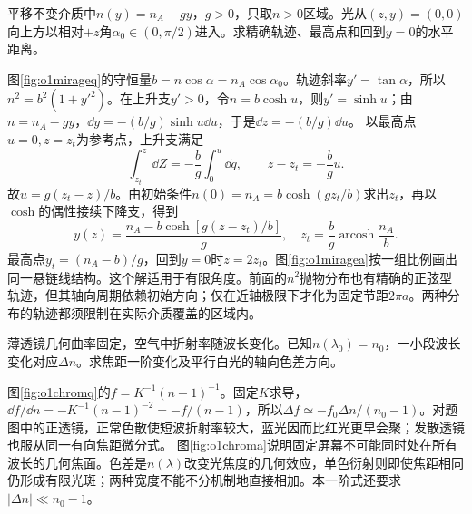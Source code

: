 \begin{exercise}\label{ex:o1mirage}
平移不变介质中$n(y)=n_A-gy$，$g>0$，只取$n>0$区域。光从$(z,y)=(0,0)$向上方以相对$+z$角$\alpha_0\in(0,\pi/2)$进入。求精确轨迹、最高点和回到$y=0$的水平距离。
\end{exercise}
\begin{solution}
图\ref{fig:o1mirageq}的守恒量$b=n\cos\alpha=n_A\cos\alpha_0$。轨迹斜率$y'=\tan\alpha$，所以$n^2=b^2(1+y'^2)$。在上升支$y'>0$，令$n=b\cosh u$，则$y'=\sinh u$；由$n=n_A-gy$，$\dd y=-(b/g)\sinh u\dd u$，于是$\dd z=-(b/g)\dd u$。
以最高点$u=0,z=z_t$为参考点，上升支满足
\[
 \int_{z_t}^{z}\dd Z=-\frac bg\int_0^u\dd q,
 \qquad z-z_t=-\frac bg u.
\]
故$u=g(z_t-z)/b$。由初始条件$n(0)=n_A=b\cosh(gz_t/b)$求出$z_t$，再以$\cosh$的偶性接续下降支，得到
\[
 y(z)=\frac{n_A-b\cosh[g(z-z_t)/b]}g,\quad
 z_t=\frac bg\operatorname{arcosh}\frac{n_A}b.
\]
最高点$y_t=(n_A-b)/g$，回到$y=0$时$z=2z_t$。图\ref{fig:o1miragea}按一组比例画出同一悬链线结构。这个解适用于有限角度。前面的$n^2$抛物分布也有精确的正弦型轨迹，但其轴向周期依赖初始方向；仅在近轴极限下才化为固定节距$2\pi a$。两种分布的轨迹都须限制在实际介质覆盖的区域内。
\end{solution}

\begin{exercise}\label{ex:o1chromatic}
薄透镜几何曲率固定，空气中折射率随波长变化。已知$n(\lambda_0)=n_0$，一小段波长变化对应$\Delta n$。求焦距一阶变化及平行白光的轴向色差方向。
\end{exercise}
\begin{solution}
图\ref{fig:o1chromq}的$f=K^{-1}(n-1)^{-1}$。固定$K$求导，$\dd f/\dd n=-K^{-1}(n-1)^{-2}=-f/(n-1)$，所以$\Delta f\simeq-f_0\Delta n/(n_0-1)$。对题图中的正透镜，正常色散使短波折射率较大，蓝光因而比红光更早会聚；发散透镜也服从同一有向焦距微分式。
图\ref{fig:o1chroma}说明固定屏幕不可能同时处在所有波长的几何焦面。色差是$n(\lambda)$改变光焦度的几何效应，单色衍射则即使焦距相同仍形成有限光斑；两种宽度不能不分机制地直接相加。本一阶式还要求$|\Delta n|\ll n_0-1$。
\end{solution}
